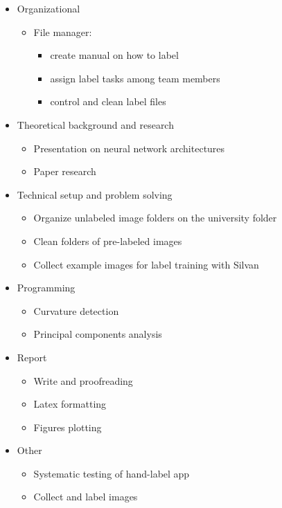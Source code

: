 \begin{itemize}
	\item Organizational
	\begin{itemize}
		\item File manager:
		\begin{itemize}
			\item create manual on how to label
			\item assign label tasks among team members
			\item control and clean label files
		\end{itemize}
	\end{itemize}
	\item Theoretical background and research
	\begin{itemize}
		\item Presentation on neural network architectures
		\item Paper research
	\end{itemize}
	\item Technical setup and problem solving
	\begin{itemize}
		\item Organize unlabeled image folders on the university folder
		\item Clean folders of pre-labeled images
		\item Collect example images for label training with Silvan
	\end{itemize}
	\item Programming
	\begin{itemize}
		\item Curvature detection
		\item Principal components analysis
	\end{itemize}
	\item Report
	\begin{itemize}
		\item Write and proofreading
		\item Latex formatting
		\item Figures plotting
	\end{itemize}
	\item Other
	\begin{itemize}
		\item Systematic testing of hand-label app
		\item Collect and label images
	\end{itemize}
\end{itemize}

